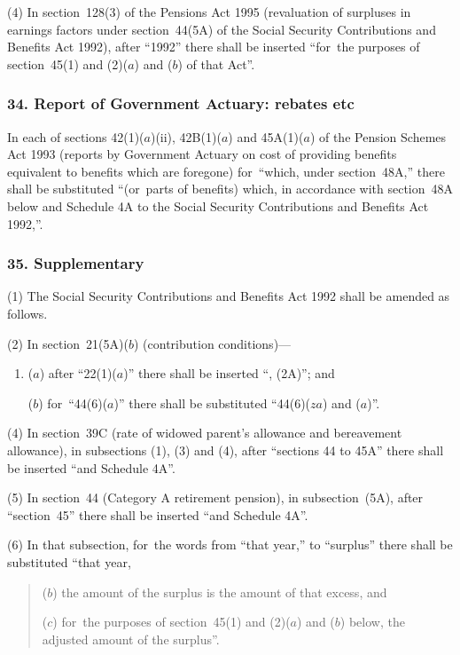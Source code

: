 \documentclass[12pt,a4paper]{article}
\begin{document}
(4) In section~128(3)  of the Pensions Act 1995 (revaluation of surpluses in earnings factors under section~44(5A)  of the Social Security Contributions and Benefits Act 1992), after “1992” there shall be inserted “for~the purposes of section~45(1)  and (2)($a$)  and ($b$)  of that Act”.

\subsubsection{34. Report of Government Actuary: rebates etc}

In each of sections 42(1)($a$)(ii), 42B(1)($a$)  and 45A(1)($a$)  of the Pension Schemes Act 1993 (reports by Government Actuary on cost of providing benefits equivalent to benefits which are foregone) for~“which, under section~48A,” there shall be substituted “(or~parts of benefits) which, in accordance with section~48A below and Schedule 4A to the Social Security Contributions and Benefits Act 1992,”.

\subsubsection{35. Supplementary}

(1) The Social Security Contributions and Benefits Act 1992 shall be amended as follows.

(2) In section~21(5A)($b$)  (contribution conditions)—
\begin{enumerate}\item[]
($a$) after “22(1)($a$)” there shall be inserted “, (2A)”; and

($b$) for~“44(6)($a$)” there shall be substituted “44(6)($za$)  and ($a$)”.
\end{enumerate}


(4) In section~39C (rate of widowed parent’s allowance and bereavement allowance), in subsections (1), (3)  and (4), after “sections 44 to 45A” there shall be inserted “and Schedule 4A”.

(5) In section~44 (Category A retirement pension), in subsection~(5A), after “section~45” there shall be inserted “and Schedule 4A”.

(6) In that subsection, for~the words from “that year,” to “surplus” there shall be substituted “that year,
\begin{quotation}
($b$) the amount of the surplus is the amount of that excess, and

($c$) for~the purposes of section~45(1)  and (2)($a$)  and ($b$)  below, the adjusted amount of the surplus”.
\end{quotation}
\end{document}
